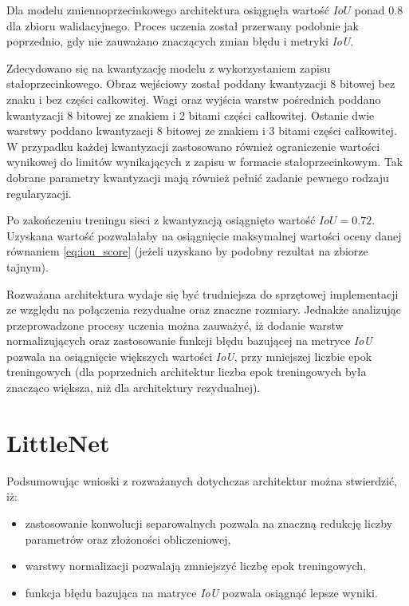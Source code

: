 Dla modelu zmiennoprzecinkowego architektura osiągnęła wartość $IoU$ ponad $0.8$ dla zbioru walidacyjnego. Proces uczenia został przerwany podobnie jak poprzednio, gdy nie zauważano znaczących zmian błędu i metryki \emph{IoU}.

Zdecydowano się na kwantyzację modelu z wykorzystaniem zapisu stałoprzecinkowego. 
Obraz wejściowy został poddany kwantyzacji 8 bitowej bez znaku i bez części całkowitej. 
Wagi oraz wyjścia warstw pośrednich poddano kwantyzacji 8 bitowej ze znakiem i 2 bitami części całkowitej.
Ostanie dwie warstwy poddano kwantyzacji 8 bitowej ze znakiem i 3 bitami części całkowitej.
W przypadku każdej kwantyzacji zastosowano również ograniczenie wartości wynikowej do limitów wynikających z zapisu w formacie stałoprzecinkowym. 
Tak dobrane parametry kwantyzacji mają również pełnić zadanie pewnego rodzaju regularyzacji.

Po zakończeniu treningu sieci z kwantyzacją osiągnięto wartość $IoU = 0.72$.
Uzyskana wartość pozwalałaby na osiągnięcie maksymalnej wartości oceny 
danej równaniem \eqref{eq:iou_score} (jeżeli uzyskano by podobny rezultat na zbiorze tajnym).

Rozważana architektura wydaje się być trudniejsza do sprzętowej implementacji ze względu na połączenia rezydualne oraz znaczne rozmiary. 
Jednakże analizując przeprowadzone procesy uczenia można zauważyć, iż dodanie warstw normalizujących oraz zastosowanie funkcji błędu bazującej na metryce \emph{IoU} pozwala na osiągnięcie większych wartości \emph{IoU}, przy mniejszej liczbie epok treningowych 
(dla poprzednich architektur liczba epok treningowych była znacząco większa, niż dla architektury rezydualnej). 


\section{LittleNet}

Podsumowując wnioski z rozważanych dotychczas architektur można stwierdzić, iż:
\begin{itemize}
    \item zastosowanie konwolucji separowalnych pozwala na znaczną redukcję liczby parametrów oraz złożoności obliczeniowej, 
    \item warstwy normalizacji pozwalają zmniejszyć liczbę epok treningowych,
    \item funkcja błędu bazująca na matryce \emph{IoU} pozwala osiągnąć lepsze wyniki.
\end{itemize}

